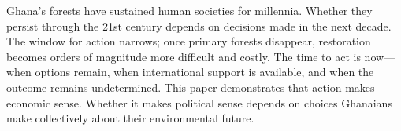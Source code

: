 Ghana's forests have sustained human societies for millennia. Whether they persist through the 21st century depends on decisions made in the next decade. The window for action narrows; once primary forests disappear, restoration becomes orders of magnitude more difficult and costly. The time to act is now—when options remain, when international support is available, and when the outcome remains undetermined. This paper demonstrates that action makes economic sense. Whether it makes political sense depends on choices Ghanaians make collectively about their environmental future.
